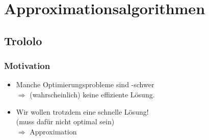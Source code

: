 

\section{Approximationsalgorithmen}
\subsection{Trololo}

\begin{frame}
	\frametitle{Motivation}
	
	\begin{itemize}
		\item Manche Optimierungsprobleme sind \classNP{}-schwer \\ $\Rightarrow$ (wahrscheinlich) keine effiziente Lösung.
		\item Wir wollen trotzdem eine schnelle Lösung! \\ (muss dafür nicht optimal sein) \\ $\Rightarrow$ Approximation
	\end{itemize}
\end{frame}

